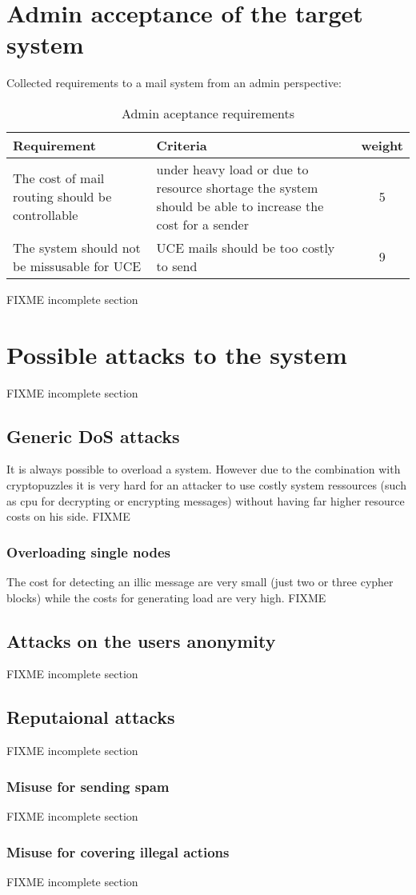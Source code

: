 \section{Admin acceptance of the target system}
Collected requirements to a mail system from an admin perspective:\par
\begin{table}[H]
  \centering
	\begin{tabular}{|p{5cm}|p{5cm}|c|}\hline
		Requirement& Criteria& weight\\\hline
		The cost of mail routing should be controllable & under heavy load or due to resource shortage the system should be able to increase the cost for a sender & 5\\
		The system should not be missusable for UCE & UCE mails should be too costly to send & 9\\
		\hline
	\end{tabular}
  \caption{Admin aceptance requirements}
  \label{tab:adminAccept}
\end{table}
FIXME incomplete section

\section{Possible attacks to the system}
FIXME incomplete section

\subsection{Generic DoS attacks}
It is always possible to overload a system. However due to the combination with cryptopuzzles it is very hard for an attacker to use costly system ressources (such as cpu for decrypting or encrypting messages) without having far higher resource costs on his side. FIXME

\subsubsection{Overloading single nodes}
The cost for detecting an illic message are very small (just two or three cypher blocks) while the costs for generating load are very high. FIXME

\subsection{Attacks on the users anonymity}
FIXME incomplete section

\subsection{Reputaional attacks}
FIXME incomplete section

\subsubsection{Misuse for sending spam}
FIXME incomplete section

\subsubsection{Misuse for covering illegal actions}
FIXME incomplete section


